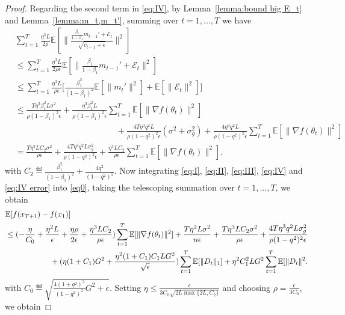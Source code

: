 \documentclass[11pt]{article}
\begin{document}
\begin{proof}
Regarding the second term in \eqref{eq:IV}, by Lemma~\ref{lemma:bound big E_t} and Lemma~\ref{lemma:m_t,m_t'}, summing over $t=1,...,T$ we have
\begin{align}
    &\sum_{t=1}^T\frac{\eta^3 L}{2\rho}\mathbb E[\|\frac{\frac{\beta_1}{1-\beta_1}m_{t-1}'+\mathcal E_t}{\sqrt{\hat v_{t-1}+\epsilon}}\|^2] \nonumber\\
    &\leq \sum_{t=1}^T\frac{\eta^3 L}{2\rho\epsilon} \mathbb E[\|\frac{\beta_1}{1-\beta_1}m_{t-1}'+\mathcal E_t\|^2] \nonumber\\
    &\leq \sum_{t=1}^T\frac{\eta^3 L}{\rho\epsilon}\Big[ \frac{\beta_1^2}{(1-\beta_1)^2}\mathbb E[\|m_t'\|^2]+ \mathbb E[\|\mathcal E_t\|^2]\Big] \nonumber\\
    &\leq \frac{T\eta^3\beta_1^2 L \sigma^2}{\rho(1-\beta_1)^2\epsilon}+\frac{\eta^3\beta_1^2 L}{\rho(1-\beta_1)^2\epsilon}\sum_{t=1}^T \mathbb E[\|\nabla f(\theta_t)\|^2] \nonumber\\
    &\hspace{2in} +\frac{4T\eta^3q^2L}{\rho(1-q^2)^2\epsilon}(\sigma^2+\sigma_g^2) + \frac{4\eta^3 q^2L}{\rho(1-q^2)^2\epsilon} \sum_{t=1}^T \mathbb E[\|\nabla f(\theta_t)\|^2 ] \nonumber\\
    &=\frac{T\eta^3 LC_2\sigma^2}{\rho\epsilon}+\frac{4T\eta^3q^2L\sigma_g^2}{\rho(1-q^2)^2\epsilon}+\frac{\eta^3LC_2}{\rho\epsilon}\sum_{t=1}^T \mathbb E[\|\nabla f(\theta_t)\|^2 ], \label{eq:IV error}
\end{align}
with $C_2\eqdef \frac{\beta_1^2}{(1-\beta_1)^2}+\frac{4q^2}{(1-q^2)^2}$. Now integrating \eqref{eq:I}, \eqref{eq:II}, \eqref{eq:III}, \eqref{eq:IV} and \eqref{eq:IV error} into \eqref{eq0}, taking the telescoping summation over $t=1,...,T$, we obtain
\begin{align*}
    &\mathbb E[f(x_{T+1})-f(x_1)]\\
    &\leq (-\frac{\eta}{C_0}+\frac{\eta^2 L}{\epsilon}+\frac{\eta \rho}{2\epsilon}+\frac{\eta^3LC_2}{\rho\epsilon})\sum_{t=1}^T\mathbb E[\|\nabla f(\theta_t)\|^2]+\frac{T\eta^2 L \sigma^2}{n\epsilon}+\frac{T\eta^3 LC_2\sigma^2}{\rho\epsilon}+\frac{4T\eta^3q^2L\sigma_g^2}{\rho(1-q^2)^2\epsilon}  \\
    &\hspace{0.8in} + (\eta(1+C_1)G^2+\frac{\eta^2 (1+C_1)C_1LG^2}{\sqrt\epsilon})\sum_{t=1}^T\mathbb E[\|D_t\|_1]+\eta^2C_1^2LG^2 \sum_{t=1}^T\mathbb E[\|D_t\|^2.
\end{align*}
with $C_0\eqdef \sqrt{\frac{4(1+q^2)^3}{(1-q^2)^2}G^2+\epsilon}$. Setting $\eta\leq \frac{\epsilon}{3C_0\sqrt{2L \max\{2L,C_2\}}}$ and choosing $\rho=\frac{\epsilon}{3C_0}$, we obtain

\end{proof}
\end{document}
